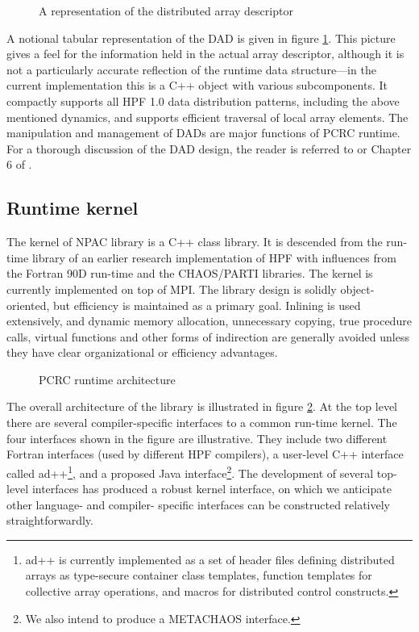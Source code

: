 \begin{figure}[bt]
\centerline{}
\caption{A representation of the distributed array descriptor}
\label{dad}
\end{figure}

A notional tabular representation of the DAD is given in figure
\ref{dad}.  This picture gives a feel for the information held in the
actual array descriptor, although it is not a particularly accurate
reflection of the runtime data structure---in the current
implementation this is a C++ object with various subcomponents.  It
compactly supports all HPF 1.0 data distribution patterns, including
the above mentioned dynamics, and supports efficient traversal of local
array elements.  The manipulation and management of DADs are major
functions of PCRC runtime.  For a thorough discussion of the DAD
design, the reader is referred to \cite{dad:1} or Chapter 6 of
\cite{Li97}.

\subsection{Runtime kernel\label{runtime}}

The kernel of NPAC library is a C++ class library.  It is
descended from the run-time library of an earlier research
implementation of HPF\cite{shpf} with influences from the
Fortran 90D run-time and the CHAOS/PARTI libraries.  The kernel
is currently implemented on top of MPI.
The library design is solidly object-oriented, but efficiency is
maintained as a primary goal.  Inlining is used extensively, and
dynamic memory allocation, unnecessary copying, true procedure calls,
virtual functions and other forms of indirection are generally avoided unless
they have clear organizational or efficiency advantages.

\begin{figure}[bt]
\centerline{}
\caption{PCRC runtime architecture\label{architecture}}
\end{figure}

The overall architecture of the library is illustrated in figure
\ref{architecture}.  At the top level there are several
compiler-specific interfaces to a common run-time kernel.  
The four interfaces shown in the figure are illustrative.
They include two different Fortran interfaces (used by different HPF
compilers), a user-level C++ interface called ad++\footnote{ad++ is
currently implemented as a set of header files defining distributed
arrays as type-secure container class templates, function templates for
collective array operations, and macros for distributed control
constructs.}, and a proposed Java interface\footnote{We also intend to
produce a METACHAOS interface.}.  The development of several top-level
interfaces has produced a robust kernel interface, on which we
anticipate other language- and compiler- specific interfaces can be
constructed relatively straightforwardly.

